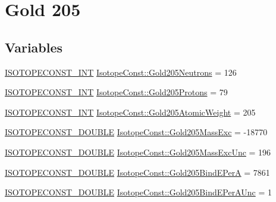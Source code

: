 \hypertarget{group___isotope_const-_gold-_au205}{}\section{Gold 205}
\label{group___isotope_const-_gold-_au205}
\subsection*{Variables}
\begin{DoxyCompactItemize}
\item 
\mbox{\hyperlink{group___isotope_const-_macros_ga5f18360b3e99483a35c32d789e62621c}{I\+S\+O\+T\+O\+P\+E\+C\+O\+N\+S\+T\+\_\+\+I\+NT}} \mbox{\hyperlink{group___isotope_const-_gold-_au205_gaee00893472a971684695e1c5d121484b}{Isotope\+Const\+::\+Gold205\+Neutrons}} = 126
\item 
\mbox{\hyperlink{group___isotope_const-_macros_ga5f18360b3e99483a35c32d789e62621c}{I\+S\+O\+T\+O\+P\+E\+C\+O\+N\+S\+T\+\_\+\+I\+NT}} \mbox{\hyperlink{group___isotope_const-_gold-_au205_ga723428b8bccac326300d2b6a90d0fac2}{Isotope\+Const\+::\+Gold205\+Protons}} = 79
\item 
\mbox{\hyperlink{group___isotope_const-_macros_ga5f18360b3e99483a35c32d789e62621c}{I\+S\+O\+T\+O\+P\+E\+C\+O\+N\+S\+T\+\_\+\+I\+NT}} \mbox{\hyperlink{group___isotope_const-_gold-_au205_ga7995ea2b38975a657b24c59dc81e6c46}{Isotope\+Const\+::\+Gold205\+Atomic\+Weight}} = 205
\item 
\mbox{\hyperlink{group___isotope_const-_macros_ga8f45a7272ce02c0b4c65c44636ed719a}{I\+S\+O\+T\+O\+P\+E\+C\+O\+N\+S\+T\+\_\+\+D\+O\+U\+B\+LE}} \mbox{\hyperlink{group___isotope_const-_gold-_au205_ga97968104de85c0617aa85e033be67c9a}{Isotope\+Const\+::\+Gold205\+Mass\+Exc}} = -\/18770
\item 
\mbox{\hyperlink{group___isotope_const-_macros_ga8f45a7272ce02c0b4c65c44636ed719a}{I\+S\+O\+T\+O\+P\+E\+C\+O\+N\+S\+T\+\_\+\+D\+O\+U\+B\+LE}} \mbox{\hyperlink{group___isotope_const-_gold-_au205_gafdb70b7d29be408a7b6239f39f4727a4}{Isotope\+Const\+::\+Gold205\+Mass\+Exc\+Unc}} = 196
\item 
\mbox{\hyperlink{group___isotope_const-_macros_ga8f45a7272ce02c0b4c65c44636ed719a}{I\+S\+O\+T\+O\+P\+E\+C\+O\+N\+S\+T\+\_\+\+D\+O\+U\+B\+LE}} \mbox{\hyperlink{group___isotope_const-_gold-_au205_ga3728812ba8836783531118c6ff260647}{Isotope\+Const\+::\+Gold205\+Bind\+E\+PerA}} = 7861
\item 
\mbox{\hyperlink{group___isotope_const-_macros_ga8f45a7272ce02c0b4c65c44636ed719a}{I\+S\+O\+T\+O\+P\+E\+C\+O\+N\+S\+T\+\_\+\+D\+O\+U\+B\+LE}} \mbox{\hyperlink{group___isotope_const-_gold-_au205_gae8c2e3bad16a5fc51e61ef628a6cdc80}{Isotope\+Const\+::\+Gold205\+Bind\+E\+Per\+A\+Unc}} = 1

\end{DoxyCompactItemize}
